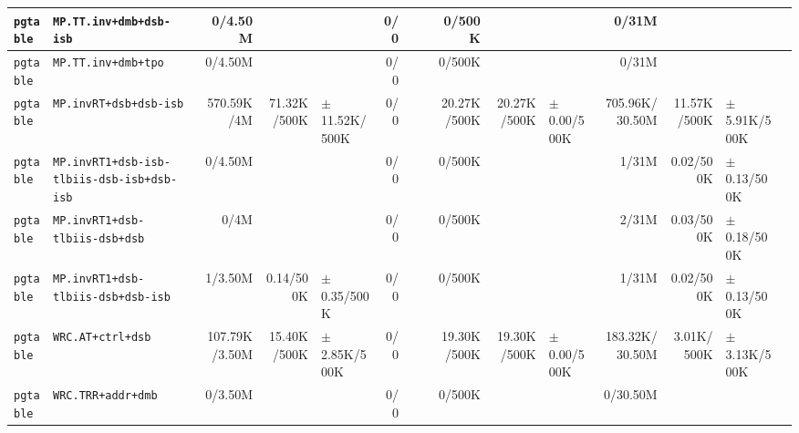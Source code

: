 \begin{tabular}{l l  | r r l | r r l | r r l | r r l l}
        \verb|pgtable| &                               \verb|MP.TT.inv+dmb+dsb-isb| &        0/4.50M &                       &                   &            0/0 &                       &  &         0/500K &                       &                   &          0/31M &                       &                   & \\ \hline 
        \verb|pgtable| &                                   \verb|MP.TT.inv+dmb+tpo| &        0/4.50M &                       &                   &            0/0 &                       &  &         0/500K &                       &                   &          0/31M &                       &                   & \\ \hline 
        \verb|pgtable| &                                \verb|MP.invRT+dsb+dsb-isb| &     570.59K/4M &           71.32K/500K & $\pm$ 11.52K/500K &            0/0 &                       &  &    20.27K/500K &           20.27K/500K &   $\pm$ 0.00/500K & 705.96K/30.50M &           11.57K/500K &  $\pm$ 5.91K/500K & \\ \hline 
        \verb|pgtable| &            \verb|MP.invRT1+dsb-isb-tlbiis-dsb-isb+dsb-isb| &        0/4.50M &                       &                   &            0/0 &                       &  &         0/500K &                       &                   &          1/31M &             0.02/500K &   $\pm$ 0.13/500K & \\ \hline 
        \verb|pgtable| &                        \verb|MP.invRT1+dsb-tlbiis-dsb+dsb| &           0/4M &                       &                   &            0/0 &                       &  &         0/500K &                       &                   &          2/31M &             0.03/500K &   $\pm$ 0.18/500K & \\ \hline 
        \verb|pgtable| &                    \verb|MP.invRT1+dsb-tlbiis-dsb+dsb-isb| &        1/3.50M &             0.14/500K &   $\pm$ 0.35/500K &            0/0 &                       &  &         0/500K &                       &                   &          1/31M &             0.02/500K &   $\pm$ 0.13/500K & \\ \hline 
        \verb|pgtable| &                                     \verb|WRC.AT+ctrl+dsb| &  107.79K/3.50M &           15.40K/500K &  $\pm$ 2.85K/500K &            0/0 &                       &  &    19.30K/500K &           19.30K/500K &   $\pm$ 0.00/500K & 183.32K/30.50M &            3.01K/500K &  $\pm$ 3.13K/500K & \\ \hline 
        \verb|pgtable| &                                    \verb|WRC.TRR+addr+dmb| &        0/3.50M &                       &                   &            0/0 &                       &  &         0/500K &                       &                   &       0/30.50M &                       &                   & \\ \hline 

\end{tabular}
